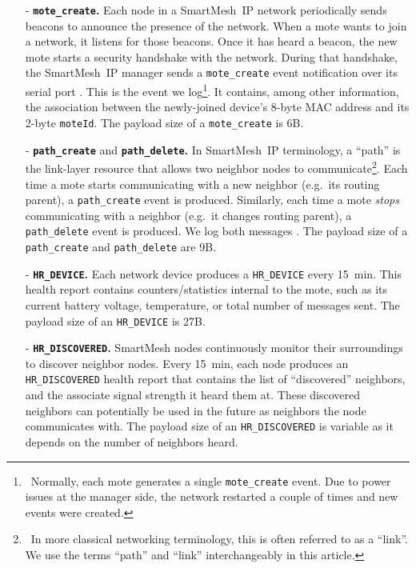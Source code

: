 \documentclass{elsarticle}
\newcommand{\sm}                  {SmartMesh\xspace}
\newcommand{\smip}                {SmartMesh~IP\xspace}
\newcommand{\HRDISCOVERED}        {{\tt HR\_DISCOVERED}\xspace}
\newcommand{\HRDEVICE}            {{\tt HR\_DEVICE}\xspace}
\newcommand{\pathcreate}          {{\tt path\_create}\xspace}
\newcommand{\pathdelete}          {{\tt path\_delete}\xspace}
\newcommand{\motecreate}          {{\tt mote\_create}\xspace}
\newcommand{\moteId}              {{\tt moteId}\xspace}
\begin{document}
\begin{itemize}
    \item[-] \textbf{\motecreate.}
        Each node in a \smip network periodically sends beacons to announce the presence of the network.
        When a mote wants to join a network, it listens for those beacons.
        Once it has heard a beacon, the new mote starts a security handshake with the network.
        During that handshake, the \smip manager sends a \motecreate event notification over its serial port \cite{smip_manager_api}.
        This is the event we log\footnote{~Normally, each mote generates a single \motecreate event. Due to power issues at the manager side, the network restarted a couple of times and new events were created.}.
        It contains, among other information, the association between the newly-joined device's 8-byte MAC address and its 2-byte \moteId.
        The payload size of a \motecreate is 6B.
    \item[-] \textbf{\pathcreate} and \textbf{\pathdelete.}
        In \smip terminology, a ``path'' is the link-layer resource that allows two neighbor nodes to communicate\footnote{~In more classical networking terminology, this is often referred to as a ``link''. We use the terms ``path'' and ``link'' interchangeably in this article.}.
        Each time a mote starts communicating with a new neighbor (e.g.~its routing parent), a \pathcreate event is produced.
        Similarly, each time a mote \textit{stops} communicating with a neighbor (e.g.~it changes routing parent), a \pathdelete event is produced.
        We log both messages \cite{smip_manager_api}.
        The payload size of a \pathcreate and \pathdelete are 9B.
    \item[-] \textbf{\HRDEVICE.}
        Each network device produces a \HRDEVICE every 15~min.
        This health report contains counters/statistics internal to the mote, such as its current battery voltage, temperature, or total number of messages sent.
        The payload size of an \HRDEVICE is 27B.
    \item[-] \textbf{\HRDISCOVERED.}
        \sm nodes continuously monitor their surroundings to discover neighbor nodes.
        Every 15~min, each node produces an \HRDISCOVERED health report that contains the list of ``discovered'' neighbors, and the associate signal strength it heard them at.
        These discovered neighbors can potentially be used in the future as neighbors the node communicates with.
        The payload size of an \HRDISCOVERED is variable as it depends on the number of neighbors heard.

\end{itemize}
\end{document}
